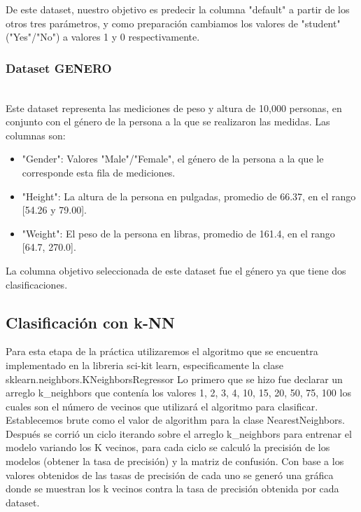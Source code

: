 \documentclass[sigconf,authorversion,nonacm]{acmart}
\begin{document}
De este dataset, nuestro objetivo es predecir la columna "default" a partir de los otros tres parámetros, y como preparación cambiamos los valores de "student" ("Yes"/"No") a valores 1 y 0 respectivamente.


\subsubsection{Dataset GENERO}\hfill\\
Este dataset representa las mediciones de peso y altura de 10,000 personas, en conjunto con el género de la persona a la que se realizaron las medidas. Las columnas son:
\begin{itemize}
  \item "Gender": Valores "Male"/"Female", el género de la persona a la que le corresponde esta fila de mediciones.
  \item "Height": La altura de la persona en pulgadas, promedio de 66.37, en el rango [54.26 y 79.00].
  \item "Weight": El peso de la persona en libras, promedio de 161.4, en el rango [64.7, 270.0].
\end{itemize}

La columna objetivo seleccionada de este dataset fue el género ya que tiene dos clasificaciones.

\subsection{Clasificación con k-NN}
Para esta etapa de la práctica utilizaremos el algoritmo que se encuentra implementado en la libreria sci-kit learn, especificamente la clase sklearn.neighbors.KNeighborsRegressor
Lo primero que se hizo fue declarar un arreglo k\_neighbors que contenía los valores 1, 2, 3, 4, 10, 15, 20, 50, 75, 100 los cuales son el número de vecinos que utilizará el algoritmo para clasificar. Establecemos brute como el valor de algorithm para la clase NearestNeighbors\(\).
Después se corrió un ciclo iterando sobre el arreglo k\_neighbors para entrenar el modelo variando los K vecinos, para cada ciclo se calculó la precisión de los modelos (obtener la tasa de precisión) y la matriz de confusión.
Con base a los valores obtenidos de las tasas de precisión de cada uno se generó una gráfica donde se muestran los k vecinos contra la tasa de precisión obtenida por cada dataset.
\end{document}
